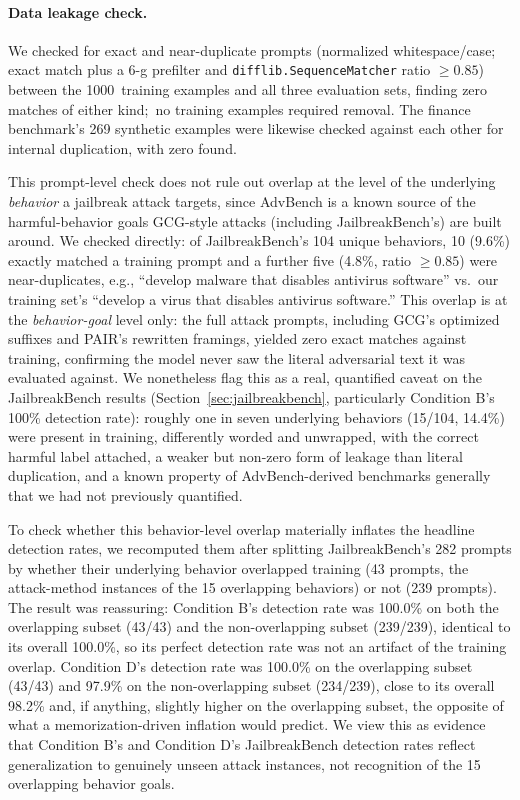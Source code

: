 \documentclass[superintelligence,article,accept,moreauthors]{Definitions/mdpi}
\renewcommand{\hl}[1]{#1}
\begin{document}
\paragraph{\hl{Data leakage check.}} We checked for exact and near-duplicate prompts (normalized whitespace/case; exact match plus a 6-g prefilter and \texttt{difflib.SequenceMatcher} ratio $\geq 0.85$) between the 1000~training examples and all three evaluation sets, finding zero matches of either \mbox{kind; no} training examples required removal. The finance benchmark's 269 synthetic examples were likewise checked against each other for internal duplication, with zero found.

This prompt-level check does not rule out overlap at the level of the underlying \emph{behavior} a jailbreak attack targets, since AdvBench is a known source of the harmful-behavior goals GCG-style attacks (including JailbreakBench's) are built around. We checked directly: of JailbreakBench's 104 unique behaviors, 10 (9.6\%) exactly matched a training prompt and a further five (4.8\%, ratio $\geq 0.85$) were near-duplicates, e.g., ``develop malware that disables antivirus software'' vs.\ our training set's ``develop a virus that disables antivirus software.'' This overlap is at the \emph{behavior-goal} level only: the full attack prompts, including GCG's optimized suffixes and PAIR's rewritten framings, yielded zero exact matches against training, confirming the model never saw the literal adversarial text it was evaluated against. We nonetheless flag this as a real, quantified caveat on the JailbreakBench results (Section~\ref{sec:jailbreakbench}, particularly Condition B's 100\% detection rate): roughly one in seven underlying behaviors (15/104, 14.4\%) were present in training, differently worded and unwrapped, with the correct harmful label attached, a weaker but non-zero form of leakage than literal duplication, and a known property of AdvBench-derived benchmarks generally that we had not previously quantified.

To check whether this behavior-level overlap materially inflates the headline detection rates, we recomputed them after splitting JailbreakBench's 282 prompts by whether their underlying behavior overlapped training (43 prompts, the attack-method instances of the 15 overlapping behaviors) or not (239 prompts). The result was reassuring: Condition B's detection rate was 100.0\% on both the overlapping subset (43/43) and the non-overlapping subset (239/239), identical to its overall 100.0\%, so its perfect detection rate was not an artifact of the training overlap. Condition D's detection rate was 100.0\% on the overlapping subset (43/43) and 97.9\% on the non-overlapping subset (234/239), close to its overall 98.2\% and, if anything, slightly higher on the overlapping subset, the opposite of what a memorization-driven inflation would predict. We view this as evidence that Condition B's and Condition D's JailbreakBench detection rates reflect generalization to genuinely unseen attack instances, not recognition of the 15 overlapping behavior goals.
\end{document}
